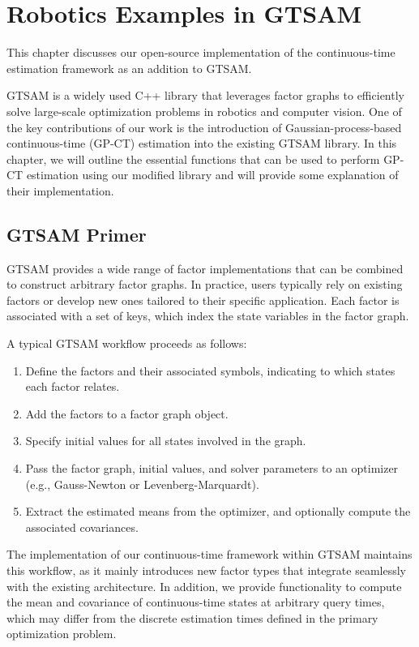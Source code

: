
\chapter{Robotics Examples in GTSAM}

This chapter discusses our open-source implementation of the continuous-time estimation framework as an addition to GTSAM.

GTSAM is a widely used C++ library that leverages factor graphs to efficiently solve large-scale optimization problems in robotics and computer vision. One of the key contributions of our work is the introduction of Gaussian-process-based continuous-time (GP-CT) estimation into the existing GTSAM library. In this chapter, we will outline the essential functions that can be used to perform GP-CT estimation using our modified library and will provide some explanation of their implementation.

\section{GTSAM Primer}

GTSAM provides a wide range of factor implementations that can be combined to construct arbitrary factor graphs.
In practice, users typically rely on existing factors or develop new ones tailored to their specific application.
Each factor is associated with a set of keys, which index the state variables in the factor graph.

A typical GTSAM workflow proceeds as follows:

\begin{enumerate}
	\item Define the factors and their associated symbols, indicating to which states each factor relates.
	\item Add the factors to a factor graph object.
	\item Specify initial values for all states involved in the graph.
	\item Pass the factor graph, initial values, and solver parameters to an optimizer (e.g., Gauss-Newton or Levenberg-Marquardt).
	\item Extract the estimated means from the optimizer, and optionally compute the associated covariances.
\end{enumerate}

The implementation of our continuous-time framework within GTSAM maintains this workflow, as it mainly introduces new factor types that integrate seamlessly with the existing architecture.
In addition, we provide functionality to compute the mean and covariance of continuous-time states at arbitrary query times, which may differ from the discrete estimation times defined in the primary optimization problem.


